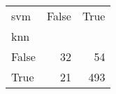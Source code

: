 \begin{tabular}{lrr}
\toprule
svm &  False &  True  \\
knn   &        &        \\
\midrule
False &     32 &     54 \\
True  &     21 &    493 \\
\bottomrule
\end{tabular}
